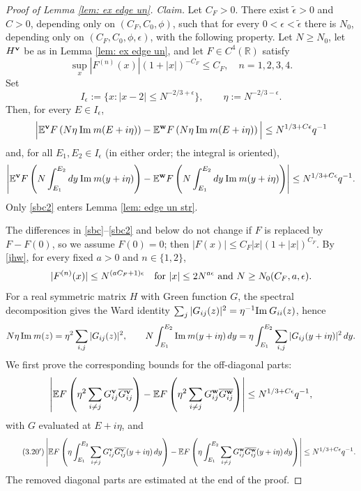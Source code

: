 \begin{proof}[Proof of Lemma \ref{lem: ex edge un}]
\textit{Claim.} Let $C_F>0$. There exist $\widetilde{\epsilon}>0$ and $C>0$, depending only on $(C_F,C_0,\phi)$, such that for every $0<\epsilon<\widetilde\epsilon$ there is $N_0$, depending only on $(C_F,C_0,\phi,\epsilon)$, with the following property. Let $N\ge N_0$, let $H^{\mathbf{v}}$ be as in Lemma \ref{lem: ex edge un}, and let $F\in C^4(\mathbb R)$ satisfy
\begin{equation}\label{jhw}
\sup_x | F^{(n)} (x) | (1+ |x|)^{-C_F} \leq C_F, \quad n = 1, 2, 3, 4.
\end{equation}
Set
\begin{equation}
I_{\epsilon}:=\{ x : |x-2| \leq N^{-2/3 + \epsilon} \}, \qquad \eta := N^{-2/3 - \epsilon}.
\end{equation}
Then, for every $E\in I_\epsilon$,
\begin{equation}\label{sbc}
\Big| \mathbb{E}^{\mathbf{v}} F \left( N \eta \: \mathrm{Im}\: m (E + i \eta) \right) - \mathbb{E}^{\mathbf{w}} F \left( N \eta \: \mathrm{Im}\: m (E + i \eta) \right) \Big| \leq N^{1/3 + C \epsilon} q^{-1}
\end{equation}
and, for all $E_1,E_2\in I_\epsilon$ (in either order; the integral is oriented),
\begin{equation}\label{sbc2}
\left| \mathbb{E}^{\mathbf{v}} F \left( N \int_{E_1}^{E_2} dy \: \mathrm{Im}\: m (y + i \eta) \right) - \mathbb{E}^{\mathbf{w}} F \left( N \int_{E_1}^{E_2} dy \: \mathrm{Im}\: m (y + i \eta) \right) \right| \leq N^{1/3 + C \epsilon} q^{-1}.
\end{equation}
Only \eqref{sbc2} enters Lemma \ref{lem: edge un str}.

The differences in \eqref{sbc}--\eqref{sbc2} and below do not change if $F$ is replaced by $F-F(0)$, so we assume $F(0)=0$; then $|F(x)|\le C_F|x|(1+|x|)^{C_F}$. By \eqref{jhw}, for every fixed $a>0$ and $n\in\{1,2\}$,
$$
|F^{(n)}(x)|\le N^{(aC_F+1)\epsilon} \quad \text{for } |x|\le 2N^{a\epsilon} \text{ and } N\ge N_0(C_F,a,\epsilon).
$$
For a real symmetric matrix $H$ with Green function $G$, the spectral decomposition gives the Ward identity $\sum_j|G_{ij}(z)|^2=\eta^{-1}\mathrm{Im}\: G_{ii}(z)$, hence
$$
N\eta\,\mathrm{Im}\: m(z)=\eta^2\sum_{i,j}|G_{ij}(z)|^2, \qquad N\int_{E_1}^{E_2}\mathrm{Im}\: m(y+i\eta)\,dy=\eta\int_{E_1}^{E_2}\sum_{i,j}|G_{ij}(y+i\eta)|^2\,dy .
$$
We first prove the corresponding bounds for the off-diagonal parts:
\begin{equation} \label{eq:claim_old}
\left| \mathbb{E} F \left( \eta^2 \sum_{i \neq j} G^{\mathbf{v}}_{ij} \overline{G^{\mathbf{v}}_{ij}} \right) - \mathbb{E} F \left( \eta^2 \sum_{i \neq j} G^{\mathbf{w}}_{ij} \overline{G^{\mathbf{w}}_{ij}} \right) \right| \leq N^{1/3 + C \epsilon} q^{-1},
\end{equation}
with $G$ evaluated at $E+i\eta$, and
\begin{equation} \tag{3.20$'$}
\left| \mathbb{E} F \left( \eta \int_{E_1}^{E_2}\sum_{i \neq j} G^{\mathbf{v}}_{ij} \overline{G^{\mathbf{v}}_{ij}}(y+i\eta)\,dy \right) - \mathbb{E} F \left( \eta\int_{E_1}^{E_2} \sum_{i \neq j} G^{\mathbf{w}}_{ij} \overline{G^{\mathbf{w}}_{ij}}(y+i\eta)\,dy \right) \right| \leq N^{1/3 + C \epsilon} q^{-1}.
\end{equation}
The removed diagonal parts are estimated at the end of the proof.


\end{proof}
